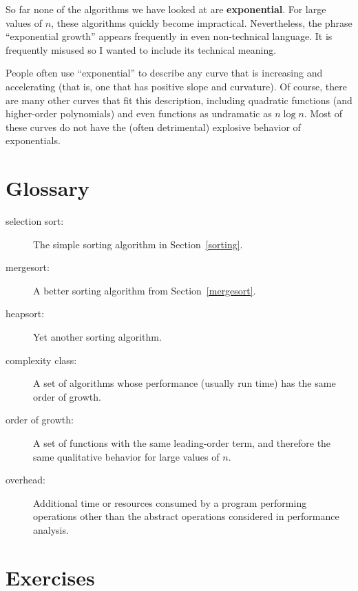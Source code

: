 \documentclass[12pt]{book}
\theoremstyle{exercise}
\begin{document}
So far none of the algorithms we have looked at are {\bf exponential}.
For large values of $n$, these algorithms quickly become impractical.
Nevertheless, the phrase ``exponential growth'' appears frequently in
even non-technical language.  It is frequently misused so I wanted to
include its technical meaning.

People often use ``exponential'' to describe any curve that is
increasing and accelerating (that is, one that has positive slope and
curvature).  Of course, there are many other curves that fit this
description, including quadratic functions (and higher-order
polynomials) and even functions as undramatic as $n \log n$.  Most
of these curves do not have the (often detrimental) explosive
behavior of exponentials.


\section{Glossary}

\begin{description}

\item[selection sort:] The simple sorting algorithm in Section~\ref{sorting}.

\item[mergesort:]  A better sorting algorithm from Section~\ref{mergesort}.

\item[heapsort:]  Yet another sorting algorithm.

\item[complexity class:]  A set of algorithms whose performance
(usually run time) has the same order of growth.

\item[order of growth:]  A set of functions with the same leading-order
term, and therefore the same qualitative behavior for large values
of $n$.

\item[overhead:]  Additional time or resources consumed by a program
performing operations other than the abstract operations considered
in performance analysis.

\end{description}


\section{Exercises}
\end{document}

